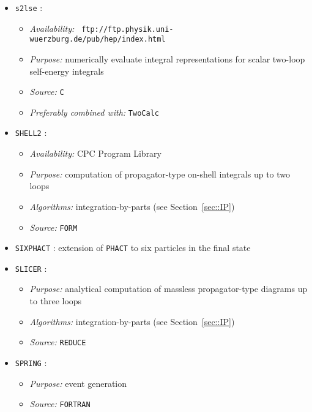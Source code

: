 \begin{itemize}

\item{\tt s2lse} \cite{Bauetal}:
  \begin{itemize}
  \item{\it Availability:} {\tt
      ftp://ftp.physik.uni-wuerzburg.de/pub/hep/index.html}
  \item{\it Purpose:} numerically evaluate integral
    representations for scalar two-loop self-energy integrals
  \item{\it Source:} {\tt C}
  \item{\it Preferably combined with:} {\tt TwoCalc}
  \end{itemize}


\item {\tt SHELL2} \cite{SHELL2}:
  \begin{itemize}
  \item {\it Availability:} CPC Program Library
  \item{\it Purpose:} computation of propagator-type on-shell integrals up to
    two loops
  \item {\it Algorithms:} integration-by-parts (see Section~\ref{sec::IP})
  \item {\it Source:} {\tt FORM}
  \end{itemize}


\item {\tt SIXPHACT} \cite{sixphact}:
  extension of {\tt PHACT} to six particles in the final state


\item {\tt SLICER} \cite{slicer}:
  \begin{itemize}
  \item{\it Purpose:} analytical computation of massless propagator-type
    diagrams up to three loops
  \item {\it Algorithms:} integration-by-parts (see Section~\ref{sec::IP}) 
  \item {\it Source:} {\tt REDUCE}
  \end{itemize}


\item{\tt SPRING} \cite{BASES/SPRING}:
  \begin{itemize}
  \item{\it Purpose:} event generation
  \item{\it Source:} {\tt FORTRAN}
  \end{itemize}


\end{itemize}
